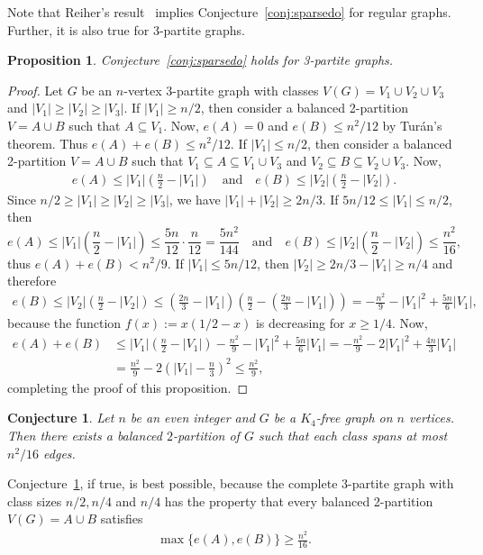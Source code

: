 \documentclass[11pt]{article}
\newtheorem{prop}[theo]{Proposition}
\newtheorem{conj}[theo]{Conjecture}
\theoremstyle{definition}
\numberwithin{theo}{section}
\begin{document}
Note that Reiher's result~\cite{ReiherK4} implies Conjecture~\ref{conj:sparsedo} for regular graphs. Further, it is also true for 3-partite graphs.
\begin{prop}
Conjecture~\ref{conj:sparsedo} holds for 3-partite graphs. 
\end{prop}
\begin{proof}
Let $G$ be an $n$-vertex $3$-partite graph with classes $V(G)=V_1\cup V_2\cup V_3$ and $|V_1|\geq |V_2|\geq |V_3|$. If $|V_1|\geq n/2$, then consider a balanced 2-partition $V=A\cup B$ such that $A\subseteq V_1$. Now, $e(A)=0$ and $e(B)\leq n^2/12$ by Tur\'an's theorem. Thus $e(A)+e(B)\leq n^2/12$. If $|V_1|\leq n/2$, then consider a balanced 2-partition $V=A\cup B$ such that $V_1\subseteq A\subseteq V_1\cup V_3$ and $V_2\subseteq B\subseteq V_2\cup V_3$. Now,
\begin{align*}
    e(A)\leq |V_1|\left(\frac{n}{2}-|V_1|\right) \quad \text{and} \quad 
        e(B)\leq |V_2|\left(\frac{n}{2}-|V_2|\right).
\end{align*}
Since $n/2\geq |V_1|\geq |V_2|\geq |V_3|$, we have $|V_1|+|V_2|\geq 2n/3$. If $5n/12\leq |V_1|\leq n/2$, then 
\begin{equation*}
    e(A)\leq |V_1|\left(\frac{n}{2}-|V_1|\right)\leq \frac{5n}{12}\cdot \frac{n}{12}=\frac{5n^2}{144} \quad \text{and} \quad  e(B)\leq |V_2|\left(\frac{n}{2}-|V_2|\right) \leq \frac{n^2}{16},
\end{equation*}
thus $e(A)+e(B)< n^2/9$. If $|V_1|\leq 5n/12$, then $|V_2|\geq 2n/3-|V_1|\geq n/4$ and therefore
\begin{align*}
    e(B)\leq |V_2|\left(\frac{n}{2}-|V_2|\right) \leq \left(\frac{2n}{3}-|V_1| \right)\left(\frac{n}{2}-\left(\frac{2n}{3}-|V_1|\right)\right)=-\frac{n^2}{9}-|V_1|^2+\frac{5n}{6}|V_1|,
\end{align*}
because the function $f(x):=x(1/2-x)$ is decreasing for $x\geq1/4$. Now,
\begin{align*}
    e(A)+e(B)&\leq |V_1|\left(\frac{n}{2}-|V_1|\right)-\frac{n^2}{9}-|V_1|^2+\frac{5n}{6}|V_1|=-\frac{n^2}{9}-2|V_1|^2+\frac{4n}{3}|V_1|\\
    &=\frac{n^2}{9}-2\left(|V_1|-\frac{n}{3}\right)^2\leq \frac{n^2}{9},
\end{align*}
completing the proof of this proposition.
\end{proof}

\begin{conj}
\label{K4bal2par}
Let $n$ be an even integer and $G$ be a $K_4$-free graph on $n$ vertices. Then there exists a balanced $2$-partition of $G$ such that each class spans at most $n^2/16$ edges.
\end{conj}
Conjecture~\ref{K4bal2par}, if true, is best possible, because the complete 3-partite graph with class sizes $n/2,n/4$ and $n/4$ has the property that every balanced 2-partition $V(G)=A\cup B$ satisfies \begin{align*}
    \max\{e(A),e(B)\}\geq \frac{n^2}{16}.
\end{align*}
 
\end{document}
